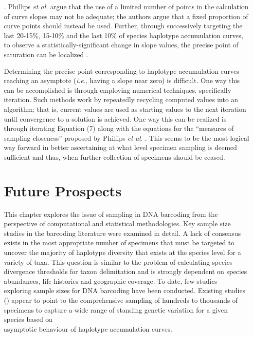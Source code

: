 \cite{phillips2015exploration}. Phillips \textit{et al.} \cite{phillips2015exploration} argue that the use of a limited number of points in the calculation of curve slopes may not be adequate; the authors argue that a fixed proportion of curve points should instead be used. Further, through successively targeting the last 20-15\%, 15-10\% and the last 10\% of species haplotype accumulation curves, to observe a statistically-significant change in slope values, the precise point of saturation can be localized \cite{phillips2015exploration}.



Determining the precise point corresponding to haplotype accumulation curves \\ reaching an asymptote (\textit{i.e.}, having a slope near zero) is difficult. One way this can be accomplished is through employing numerical techniques, specifically iteration. Such methods work by repeatedly recycling computed values into an algorithm; that is, current values are used as starting values to the next iteration until convergence to a solution is achieved. One way this can be realized is through iterating Equation (7) along with the equations for the ``measures of sampling closeness'' proposed by Phillips \textit{et al.} \cite{phillips2015exploration}. This seems to be the most logical way forward in better ascertaining at what level specimen sampling is deemed sufficient and thus, when further collection of specimens should be ceased.

\section{Future Prospects}


This chapter explores the issue of sampling in DNA barcoding from the perspective of computational and statistical methodologies. Key sample size studies in the barcoding literature were examined in detail. A lack of consensus exists in the most appropriate number of specimens that must be targeted to uncover the majority of haplotype diversity that exists at the species level for a variety of taxa. This question is similar to the problem of calculating species divergence thresholds for taxon delimitation and is strongly dependent on species abundances, life histories and geographic coverage. To date, few studies \\ exploring sample sizes for DNA barcoding have been conducted. Existing studies (\cite{phillips2015exploration, zhang2010estimating}) appear to point to the comprehensive sampling of hundreds to thousands of specimens to capture a wide range of standing genetic variation for a given species based on \\ asymptotic behaviour of haplotype accumulation curves.



